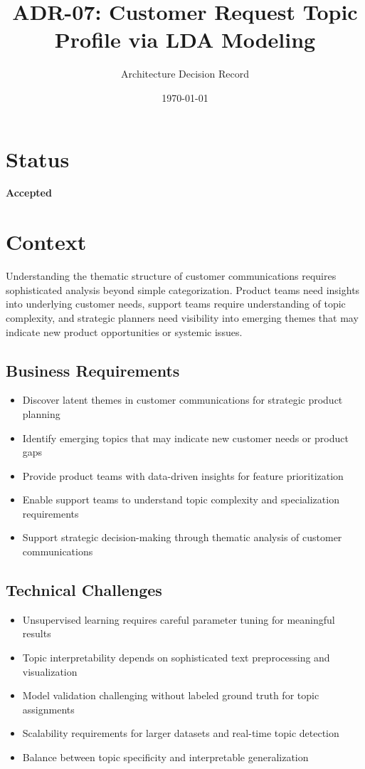 \documentclass[11pt]{article}
\title{\textbf{ADR-07: Customer Request Topic Profile via LDA Modeling}}
\author{Architecture Decision Record}
\date{\today}
\begin{document}
\maketitle

\section{Status}
\textbf{Accepted}

\section{Context}

Understanding the thematic structure of customer communications requires sophisticated analysis beyond simple categorization. Product teams need insights into underlying customer needs, support teams require understanding of topic complexity, and strategic planners need visibility into emerging themes that may indicate new product opportunities or systemic issues.

\subsection{Business Requirements}
\begin{itemize}
\item Discover latent themes in customer communications for strategic product planning
\item Identify emerging topics that may indicate new customer needs or product gaps
\item Provide product teams with data-driven insights for feature prioritization
\item Enable support teams to understand topic complexity and specialization requirements
\item Support strategic decision-making through thematic analysis of customer communications
\end{itemize}

\subsection{Technical Challenges}
\begin{itemize}
\item Unsupervised learning requires careful parameter tuning for meaningful results
\item Topic interpretability depends on sophisticated text preprocessing and visualization
\item Model validation challenging without labeled ground truth for topic assignments
\item Scalability requirements for larger datasets and real-time topic detection
\item Balance between topic specificity and interpretable generalization
\end{itemize}
\end{document}
